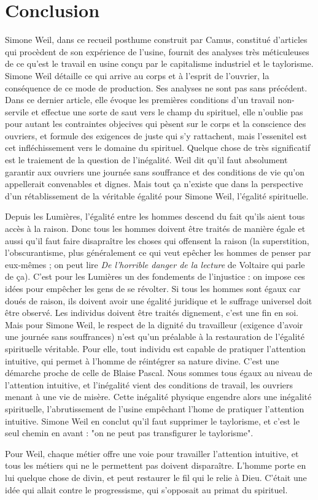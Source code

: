 \documentclass[a4paper,12pt]{book}
\begin{document}
\section{Conclusion}
Simone Weil, dans ce recueil posthume construit par Camus, constitué d'articles qui procèdent de son expérience de l'usine, fournit des analyses très méticuleuses de ce qu'est le travail en usine conçu par le capitalisme industriel et le taylorisme. Simone Weil détaille ce qui arrive au corps et à l'esprit de l'ouvrier, la conséquence de ce mode de production. Ses analyses ne sont pas sans précédent. Dans ce dernier article, elle évoque les premières conditions d'un travail non-servile et effectue une sorte de saut vers le champ du spirituel, elle n'oublie pas pour autant les contraintes objecives qui pèsent sur le corps et la conscience des ouvriers, et formule des exigences de juste qui s'y rattachent, mais l'essenitel est cet infléchissement vers le domaine du spirituel. Quelque chose de très significatif est le traiement de la question de l'inégalité. Weil dit qu'il faut absolument garantir aux ouvriers une journée sans souffrance et des conditions de vie qu'on appellerait convenables et dignes. Mais tout ça n'existe que dans la perspective d'un rétablissement de la véritable égalité pour Simone Weil, l'égalité spirituelle.
\par Depuis les Lumières, l'égalité entre les hommes descend du fait qu'ils aient tous accès à la raison. Donc tous les hommes doivent être traités de manière égale et aussi qu'il faut faire disapraître les choses qui offensent la raison (la superstition, l'obscurantisme, plus généralement ce qui veut epêcher les hommes de penser par eux-mêmes ; on peut lire \textit{De l'horrible danger de la lecture} de Voltaire qui parle de ça). C'est pour les Lumières un des fondements de l'injustice : on impose ces idées pour empêcher les gens de se révolter. Si tous les hommes sont égaux car doués de raison, ils doivent avoir une égalité juridique et le suffrage universel doit être observé. Les individus doivent être traités dignement, c'est une fin en soi. Mais pour Simone Weil, le respect de la dignité du travailleur (exigence d'avoir une journée sans souffrances) n'est qu'un préalable à la restauration de l'égalité spirituelle véritable. Pour elle, tout individu est capable de pratiquer l'attention intuitive, qui permet à l'homme de réintégrer sa nature divine. C'est une démarche proche de celle de Blaise Pascal. Nous sommes tous égaux au niveau de l'attention intuitive, et l'inégalité vient des conditions de travail, les ouvriers menant à une vie de misère. Cette inégalité physique engendre alors une inégalité spirituelle, l'abrutissement de l'usine empêchant l'home de pratiquer l'attention intuitive. Simone Weil en conclut qu'il faut supprimer le taylorisme, et c'est le seul chemin en avant : "on ne peut pas transfigurer le taylorisme".
\par Pour Weil, chaque métier offre une voie pour travailler l'attention intuitive, et tous les métiers qui ne le permettent pas doivent disparaître. L'homme porte en lui quelque chose de divin, et peut restaurer le fil qui le relie à Dieu. C'était une idée qui allait contre le progressisme, qui s'opposait au primat du spirituel.
\end{document}
